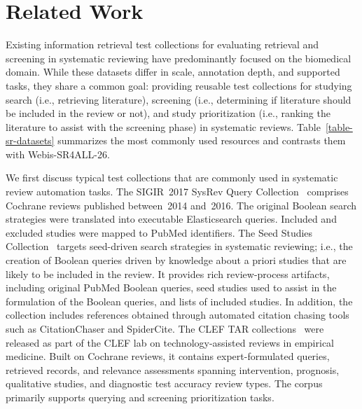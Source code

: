 \section{Related Work}

Existing information retrieval test collections for evaluating retrieval and screening in systematic reviewing have predominantly focused on the biomedical domain. While these datasets differ in scale, annotation depth, and supported tasks, they share a common goal: providing reusable test collections for studying search (i.e., retrieving literature), screening (i.e., determining if literature should be included in the review or not), and study prioritization (i.e., ranking the literature to assist with the screening phase) in systematic reviews. Table~\ref{table-sr-datasets} summarizes the most commonly used resources and contrasts them with Webis-SR4ALL-26.

We first discuss typical test collections that are commonly used in systematic review automation tasks. The SIGIR~2017 SysRev Query Collection~\cite{scells:2017} comprises Cochrane reviews published between~2014 and~2016. The original Boolean search strategies were translated into executable Elasticsearch queries. Included and excluded studies were mapped to PubMed identifiers. The Seed Studies Collection~\cite{wang:2022} targets seed-driven search strategies in systematic reviewing; i.e., the creation of Boolean queries driven by knowledge about a priori studies that are likely to be included in the review. It provides rich review-process artifacts, including original PubMed Boolean queries, seed studies used to assist in the formulation of the Boolean queries, and lists of included studies. In addition, the collection includes references obtained through automated citation chasing tools such as CitationChaser and SpiderCite. The CLEF TAR collections~\cite{kanoulas:2017,kanoulas:2018,kanoulas:2019} were released as part of the CLEF lab on technology-assisted reviews in empirical medicine. Built on Cochrane reviews, it contains expert-formulated queries, retrieved records, and relevance assessments spanning intervention, prognosis, qualitative studies, and diagnostic test accuracy review types. The corpus primarily supports querying and screening prioritization tasks. 

